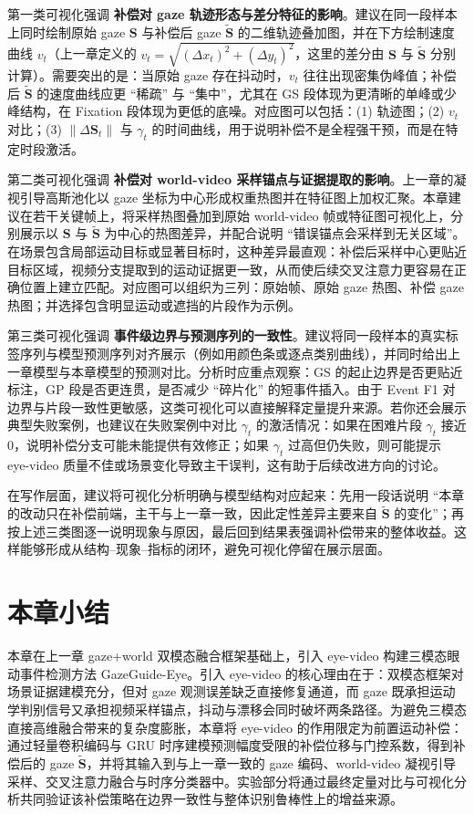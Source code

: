 \documentclass{xdupgthesis}
\newcommand{\ModelMM}{GazeGuide}
\begin{document}
第一类可视化强调 \textbf{补偿对 gaze 轨迹形态与差分特征的影响}。建议在同一段样本上同时绘制原始 gaze $\mathbf{S}$ 与补偿后 gaze $\tilde{\mathbf{S}}$ 的二维轨迹叠加图，并在下方绘制速度曲线 $v_t$（上一章定义的 $v_t=\sqrt{(\Delta x_t)^2+(\Delta y_t)^2}$，这里的差分由 $\mathbf{S}$ 与 $\tilde{\mathbf{S}}$ 分别计算）。需要突出的是：当原始 gaze 存在抖动时，$v_t$ 往往出现密集伪峰值；补偿后 $\tilde{\mathbf{S}}$ 的速度曲线应更 ``稀疏'' 与 ``集中''，尤其在 GS 段体现为更清晰的单峰或少峰结构，在 Fixation 段体现为更低的底噪。对应图可以包括：(1) 轨迹图；(2) $v_t$ 对比；(3) $\|\Delta\mathbf{S}_t\|$ 与 $\gamma_t$ 的时间曲线，用于说明补偿不是全程强干预，而是在特定时段激活。

第二类可视化强调 \textbf{补偿对 world-video 采样锚点与证据提取的影响}。上一章的凝视引导高斯池化以 gaze 坐标为中心形成权重热图并在特征图上加权汇聚。本章建议在若干关键帧上，将采样热图叠加到原始 world-video 帧或特征图可视化上，分别展示以 $\mathbf{S}$ 与 $\tilde{\mathbf{S}}$ 为中心的热图差异，并配合说明 ``错误锚点会采样到无关区域''。在场景包含局部运动目标或显著目标时，这种差异最直观：补偿后采样中心更贴近目标区域，视频分支提取到的运动证据更一致，从而使后续交叉注意力更容易在正确位置上建立匹配。对应图可以组织为三列：原始帧、原始 gaze 热图、补偿 gaze 热图；并选择包含明显运动或遮挡的片段作为示例。

第三类可视化强调 \textbf{事件级边界与预测序列的一致性}。建议将同一段样本的真实标签序列与模型预测序列对齐展示（例如用颜色条或逐点类别曲线），并同时给出上一章模型与本章模型的预测对比。分析时应重点观察：GS 的起止边界是否更贴近标注，GP 段是否更连贯，是否减少 ``碎片化'' 的短事件插入。由于 Event F1 对边界与片段一致性更敏感，这类可视化可以直接解释定量提升来源。若你还会展示典型失败案例，也建议在失败案例中对比 $\gamma_t$ 的激活情况：如果在困难片段 $\gamma_t$ 接近 0，说明补偿分支可能未能提供有效修正；如果 $\gamma_t$ 过高但仍失败，则可能提示 eye-video 质量不佳或场景变化导致主干误判，这有助于后续改进方向的讨论。

在写作层面，建议将可视化分析明确与模型结构对应起来：先用一段话说明 ``本章的改动只在补偿前端，主干与上一章一致，因此定性差异主要来自 $\tilde{\mathbf{S}}$ 的变化''；再按上述三类图逐一说明现象与原因，最后回到结果表强调补偿带来的整体收益。这样能够形成从结构--现象--指标的闭环，避免可视化停留在展示层面。

\section{本章小结}

本章在上一章 gaze+world 双模态融合框架基础上，引入 eye-video 构建三模态眼动事件检测方法 \ModelMM{}-Eye。引入 eye-video 的核心理由在于：双模态框架对场景证据建模充分，但对 gaze 观测误差缺乏直接修复通道，而 gaze 既承担运动学判别信号又承担视频采样锚点，抖动与漂移会同时破坏两条路径。为避免三模态直接高维融合带来的复杂度膨胀，本章将 eye-video 的作用限定为前置运动补偿：通过轻量卷积编码与 GRU 时序建模预测幅度受限的补偿位移与门控系数，得到补偿后的 gaze $\tilde{\mathbf{S}}$，并将其输入到与上一章一致的 gaze 编码、world-video 凝视引导采样、交叉注意力融合与时序分类器中。实验部分将通过最终定量对比与可视化分析共同验证该补偿策略在边界一致性与整体识别鲁棒性上的增益来源。
\end{document}
